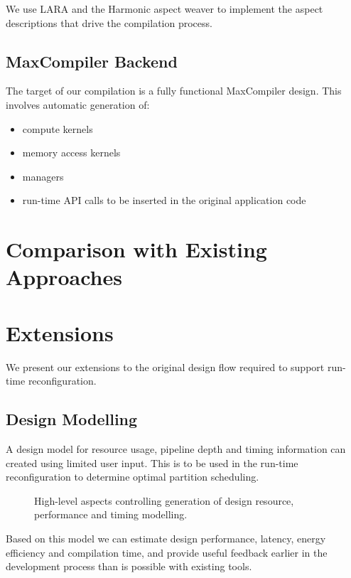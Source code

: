 We use LARA and the Harmonic aspect weaver to implement the aspect
descriptions that drive the compilation process.

\subsection{MaxCompiler Backend}

The target of our compilation is a fully functional MaxCompiler design.
This involves automatic generation of:
\begin{itemize}
\item compute kernels
\item memory access kernels
\item managers
\item run-time API calls to be inserted in the original application code
\end{itemize}


\section{Comparison with Existing Approaches}



\section{Extensions}

We present our extensions to the original design flow required to
support run-time reconfiguration.

\subsection{Design Modelling}

A design model for resource usage, pipeline depth and timing
information can created using limited user input. This is to be used
in the run-time reconfiguration to determine optimal partition
scheduling.

\begin{figure}[!ht]
  \centering
  \def\svgwidth{\textwidth}
  
  \caption{High-level aspects controlling generation of design
    resource, performance and timing modelling.}
  \label{fig:reconfig-design-flow}
\end{figure}

Based on this model we can estimate design performance, latency,
energy efficiency and compilation time, and provide useful feedback
earlier in the development process than is possible with existing
tools.

